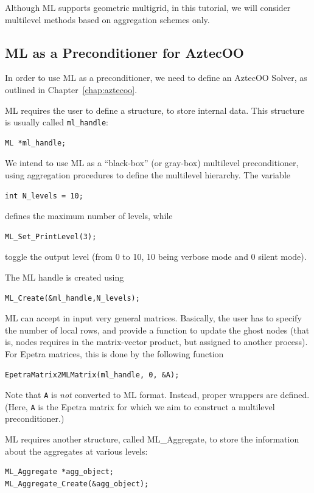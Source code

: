 \begin{remark}
  Although ML supports geometric multigrid, in this tutorial, we will
  consider multilevel methods based on aggregation schemes only.
\end{remark}


\subsection{ML as a Preconditioner for AztecOO}
\label{sec:ml_prec}

In order to use ML as a preconditioner, we need to define an
AztecOO Solver, as outlined in Chapter~\ref{chap:aztecoo}. 

ML requires the user to define a structure, to store internal data. This
structure is usually called \verb!ml_handle!:
\begin{verbatim}
ML *ml_handle;
\end{verbatim}

We intend to use ML as a ``black-box'' (or gray-box) multilevel
preconditioner, using aggregation procedures to define the multilevel
hierarchy. The variable
\begin{verbatim}
int N_levels = 10;
\end{verbatim}
defines the maximum number of levels, while
\begin{verbatim}
ML_Set_PrintLevel(3);
\end{verbatim}
toggle the output level (from 0 to 10, 10 being verbose mode and 0
silent mode).

The ML handle is created using
\begin{verbatim}
ML_Create(&ml_handle,N_levels);
\end{verbatim}
ML can accept in input very general matrices. Basically, the user has to
specify the number of local rows, and provide a function to update the
ghost nodes (that is, nodes requires in the matrix-vector product, but
assigned to another process). For Epetra matrices, this is done by the
following function
\begin{verbatim}
EpetraMatrix2MLMatrix(ml_handle, 0, &A);
\end{verbatim}
Note that \verb!A! is {\sl not} converted to ML format. Instead, proper
wrappers are defined.  (Here, \verb!A! is the Epetra matrix for which we
aim to construct a multilevel preconditioner.)

ML requires another structure, called ML\_Aggregate, to store the
information about the aggregates at various levels:
\begin{verbatim}
ML_Aggregate *agg_object;
ML_Aggregate_Create(&agg_object);
\end{verbatim}

